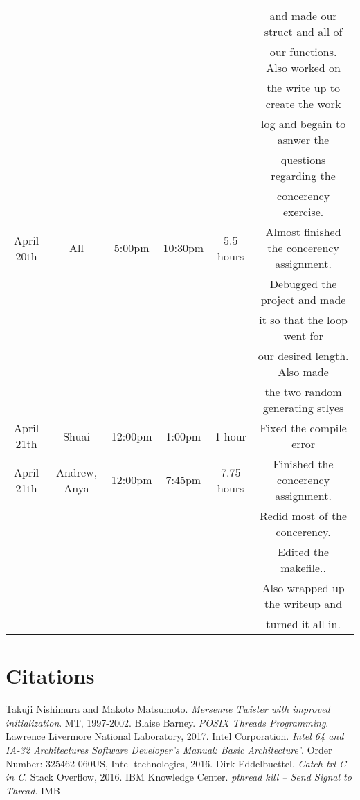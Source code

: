 \begin{center}
\begin{tabular}{ |c|c|c|c|c|c| }
    &  &  &  &  & and made our struct and all of \\
    &  &  &  &  & our functions. Also worked on\\
    &  &  &  &  & the write up to create the work\\
    &  &  &  &  & log and begain to asnwer the\\
    &  &  &  &  & questions regarding the \\
    &  &  &  &  & concerency exercise. \\
   \hline
   April 20th & All & 5:00pm & 10:30pm & 5.5 hours & Almost finished the concerency assignment.\\
    &  &  &  &  & Debugged the project and made\\
    &  &  &  &  & it so that the loop went for \\
    &  &  &  &  & our desired length. Also made\\
    &  &  &  &  & the two random generating stlyes\\
   \hline
   April 21th & Shuai & 12:00pm & 1:00pm & 1 hour & Fixed the compile error\\
   \hline
   April 21th & Andrew, Anya & 12:00pm & 7:45pm & 7.75 hours & Finished the concerency assignment.\\
    &  &  &  &  & Redid most of the concerency.\\
    &  &  &  &  & Edited the makefile..\\
    &  &  &  &  & Also wrapped up the writeup and\\
    &  &  &  &  & turned it all in.\\
   \hline
\end{tabular}
\end{center}

\section{Citations}
\begin{thebibliography}{9}
      Takuji Nishimura and Makoto Matsumoto.
      \textit{Mersenne Twister with improved initialization}.
      MT, 1997-2002.
      Blaise Barney.
      \textit{POSIX Threads Programming}.
      Lawrence Livermore National Laboratory, 2017.
      Intel Corporation.
      \textit{Intel 64 and IA-32 Architectures Software Developer's Manual: Basic Architecture'}.
      Order Number: 325462-060US, Intel technologies, 2016.
      Dirk Eddelbuettel.
      \textit{Catch trl-C in C}.
      Stack Overflow, 2016.
      IBM Knowledge Center.
      \textit{pthread kill -- Send Signal to Thread}.
      IMB

   \end{thebibliography}

